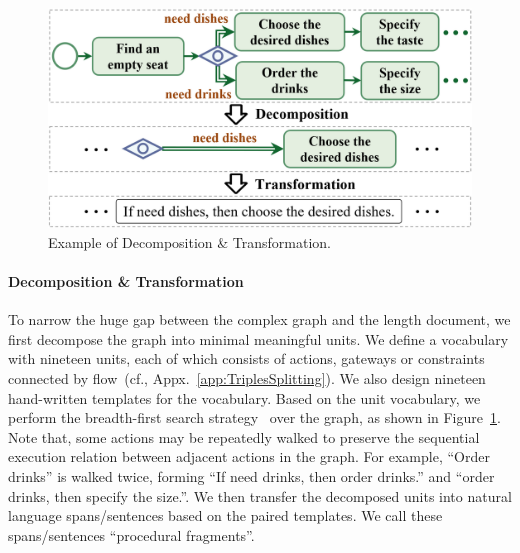 \begin{figure}[t]
    \centering
    \includegraphics[width=\linewidth]{figures/dataset/DatasetConstruction_1.png}
    \caption{Example of Decomposition \& Transformation.
    }
    \label{fig:Decomposition}
\end{figure}
\paragraph{Decomposition \& Transformation}
To narrow the huge gap between the complex graph and the length document, we first decompose the graph into minimal meaningful units. We define a vocabulary with nineteen units, each of which consists of actions, gateways or constraints connected by flow~(cf., Appx.~\ref{app:TriplesSplitting}). We also design nineteen hand-written templates for the vocabulary. Based on the unit vocabulary, we perform the breadth-first search strategy~\cite{10.1016/0004-3702(85)90084-0} over the graph, as shown in Figure~\ref{fig:Decomposition}. Note that, some actions may be repeatedly walked to preserve the sequential execution relation between adjacent actions in the graph. For example, ``Order drinks'' is walked twice, forming ``If need drinks, then order drinks.'' and ``order drinks, then specify the size.''. We then transfer the decomposed units into natural language spans/sentences based on the paired templates. We call these spans/sentences ``procedural fragments''. 


